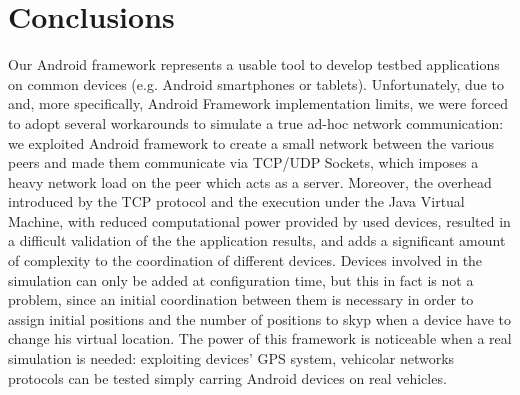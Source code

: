 \newpage
\section{Conclusions}

	Our Android framework represents a usable tool to develop testbed applications on common devices (e.g. Android smartphones or tablets). Unfortunately, due to \direct and, more specifically, Android \direct Framework implementation limits, we were forced to adopt several workarounds to simulate a true ad-hoc network communication: we exploited Android \direct framework to create a small network between the various peers and made them communicate via TCP/UDP Sockets, which imposes a heavy network load on the peer which acts as a server. Moreover, the overhead introduced by the TCP protocol and the execution under the Java Virtual Machine, with reduced computational power provided by used devices, resulted in a difficult validation of the the application results, and adds a significant amount of complexity to the coordination of different devices.
	Devices involved in the simulation can only be added at configuration time, but this in fact is not a problem, since an initial coordination between them is necessary in order to assign initial positions and the number of positions to skyp when a device have to change his virtual location. 
	The power of this framework is noticeable when a real simulation is needed: exploiting devices' GPS system, vehicolar networks protocols can be tested simply carring Android devices on real vehicles. 
	
